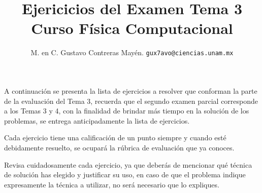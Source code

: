 
\usetikzlibrary{patterns, arrows}
\usetikzlibrary{decorations.markings}
\usetikzlibrary{matrix}

\title{Ejericicios del Examen Tema 3 \\ {\large Curso Física Computacional}}
\author{M. en C. Gustavo Contreras Mayén. \texttt{gux7avo@ciencias.unam.mx}}

\date{ }


\maketitle
\fontsize{14}{14}\selectfont

A continuación se presenta la lista de ejercicios a resolver que conforman la parte de la evaluación del Tema 3, recuerda que el segundo examen parcial corresponde a los Temas 3 y 4, con la finalidad de brindar más tiempo en la solución de los problemas, se entrega anticipadamente la lista de ejercicios.
\par
Cada ejercicio tiene una calificación de un punto siempre y cuando esté debidamente resuelto, se ocupará la rúbrica de evaluación que ya conoces.
\par
Revisa cuidadosamente cada ejercicio, ya que deberás de mencionar qué técnica de solución has elegido y justificar su uso, en caso de que el problema indique expresamente la técnica a utilizar, no será necesario que lo expliques.

